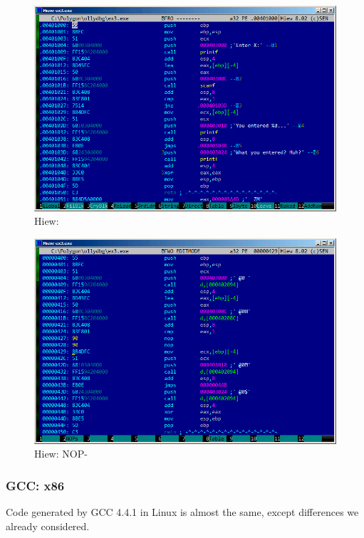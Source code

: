 \begin{figure}[H]
\centering
\includegraphics[scale=0.66]{patterns/04_scanf/ex3_hiew_1.png}
\caption{Hiew: \main{}}
\label{fig:scanf_ex3_hiew_1}
\end{figure}

\begin{figure}[H]
\centering
\includegraphics[scale=0.66]{patterns/04_scanf/ex3_hiew_2.png}
\caption{Hiew:    \ac{NOP}-}
\label{fig:scanf_ex3_hiew_2}
\end{figure}

\subsubsection{GCC: x86}

{Code generated by GCC 4.4.1 in Linux is almost the same, except differences we already considered.}
